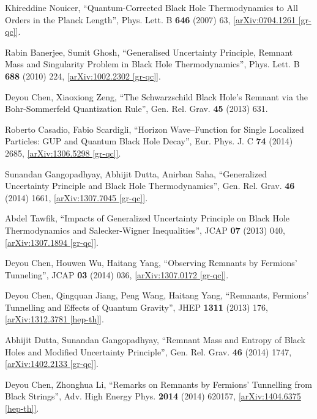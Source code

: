 \documentclass[12pt]{article}
\newcommand{\2}{$^2$}
\newcommand{\3}{$^3$}
\newcommand{\4}{$_4$}
\newcommand{\5}{$_5$}
\begin{document}
\begin{thebibliography}{400}
Khireddine Nouicer, ``Quantum-Corrected Black Hole Thermodynamics to All Orders in the Planck Length'',  	Phys. Lett. B \textbf{646} (2007) 63, \href{http://arxiv.org/abs/0704.1261}{[arXiv:0704.1261 [gr-qc]]}.

Rabin Banerjee, Sumit Ghosh, ``Generalised Uncertainty Principle, Remnant Mass and Singularity Problem in Black Hole Thermodynamics'',  	Phys. Lett. B \textbf{688} (2010) 224, \href{http://arxiv.org/abs/1002.2302}{[arXiv:1002.2302 [gr-qc]]}.

 Deyou Chen, Xiaoxiong Zeng, ``The Schwarzschild Black Hole's Remnant via the Bohr-Sommerfeld Quantization Rule'', Gen. Rel. Grav. \textbf{45} (2013) 631.

Roberto Casadio, Fabio Scardigli, ``Horizon Wave--Function for Single Localized Particles: GUP and Quantum Black Hole Decay'', Eur. Phys. J. C \textbf{74} (2014) 2685, \href{http://arxiv.org/abs/1306.5298}{[arXiv:1306.5298 [gr-qc]]}.
 
Sunandan Gangopadhyay, Abhijit Dutta, Anirban Saha, ``Generalized Uncertainty Principle and Black Hole Thermodynamics'',  	Gen. Rel. Grav. \textbf{46} (2014) 1661, \href{http://arxiv.org/abs/1307.7045}{[arXiv:1307.7045 [gr-qc]]}.

Abdel Tawfik, ``Impacts of Generalized Uncertainty Principle on Black Hole Thermodynamics and Salecker-Wigner Inequalities'', JCAP \textbf{07} (2013) 040, \href{http://arxiv.org/abs/1307.1894}{[arXiv:1307.1894 [gr-qc]]}.



Deyou Chen, Houwen Wu, Haitang Yang, ``Observing Remnants by Fermions' Tunneling'',  JCAP \textbf{03} (2014) 036, \href{http://arxiv.org/abs/1307.0172}{[arXiv:1307.0172 [gr-qc]]}.

Deyou Chen, Qingquan Jiang, Peng Wang, Haitang Yang, ``Remnants, Fermions' Tunnelling and Effects of Quantum Gravity'',  	JHEP \textbf{1311} (2013) 176, \href{http://arxiv.org/abs/1312.3781}{[arXiv:1312.3781 [hep-th]]}. 

Abhijit Dutta, Sunandan Gangopadhyay, ``Remnant Mass and Entropy of Black Holes and Modified Uncertainty Principle'', Gen. Rel. Grav. \textbf{46} (2014)  1747, \href{http://arxiv.org/abs/1402.2133}{[arXiv:1402.2133 [gr-qc]]}.

Deyou Chen, Zhonghua Li, ``Remarks on Remnants by Fermions' Tunnelling from Black Strings'', Adv. High Energy Phys. \textbf{2014} (2014) 620157, \href{http://arxiv.org/abs/1404.6375}{[arXiv:1404.6375 [hep-th]]}.


\end{thebibliography}
\end{document}
